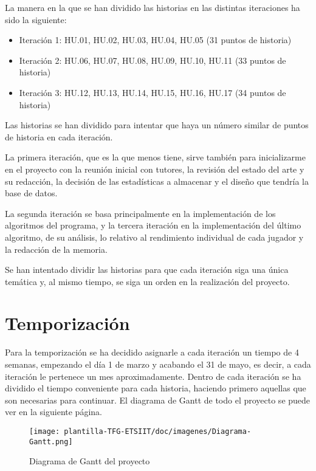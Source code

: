 La manera en la que se han dividido las historias en las distintas iteraciones ha sido la siguiente:
\begin{itemize}
    \item Iteración 1: HU.01, HU.02, HU.03, HU.04, HU.05 (31 puntos de historia)
    \item Iteración 2: HU.06, HU.07, HU.08, HU.09, HU.10, HU.11 (33 puntos de historia)
    \item Iteración 3: HU.12, HU.13, HU.14, HU.15, HU.16, HU.17 (34 puntos de historia)
    
\end{itemize}

Las historias se han dividido para intentar que haya un número similar de puntos de historia en cada iteración. 

La primera iteración, que es la que menos tiene, sirve también para inicializarme en el proyecto con la reunión inicial con tutores, la revisión del estado del  arte y su redacción, la decisión de las estadísticas a almacenar y el diseño que tendría la base de datos.

La segunda iteración se basa principalmente en la implementación de los algoritmos del programa, y la tercera iteración en la implementación del último algoritmo, de su análisis, lo relativo al rendimiento individual de cada jugador y la redacción de la memoria.

Se han intentado dividir las historias para que cada iteración siga una única temática y, al mismo tiempo, se siga un orden en la realización del proyecto.

\section{Temporización}
Para la temporización se ha decidido asignarle a cada iteración un tiempo de 4 semanas, empezando el día 1 de marzo y acabando el 31 de mayo, es decir, a cada iteración le pertenece un mes aproximadamente. Dentro de cada iteración se ha dividido el tiempo conveniente para cada historia, haciendo primero aquellas que son necesarias para continuar. El diagrama de Gantt de todo el proyecto se puede ver en la siguiente página.

\begin{figure}[p]
    \centering
    \begin{sideways}
        \texttt{[image: plantilla-TFG-ETSIIT/doc/imagenes/Diagrama-Gantt.png]}
    \end{sideways}
    \caption{Diagrama de Gantt del proyecto}
    \label{fig:imagen-ajustada}
\end{figure}

